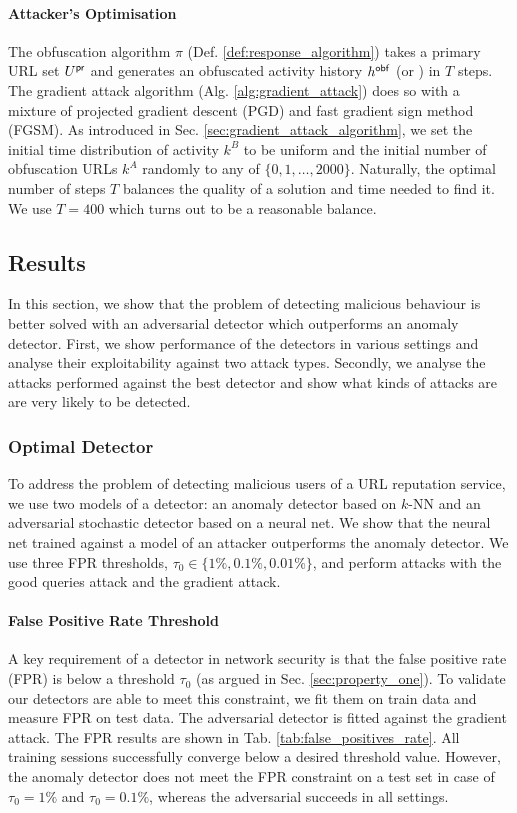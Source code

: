 \paragraph{Attacker's Optimisation}
The obfuscation algorithm $\pi$ (Def. \ref{def:response_algorithm}) takes a primary URL set $U^{\mathsf{pr}}$ and generates an obfuscated activity history $h^{\mathsf{obf}}$ (or \NA) in $T$ steps. The gradient attack algorithm (Alg. \ref{alg:gradient_attack}) does so with a mixture of projected gradient descent (PGD) and fast gradient sign method (FGSM).
As introduced in Sec. \ref{sec:gradient_attack_algorithm}, we set the initial time distribution of activity $k^B$ to be uniform and the initial number of obfuscation URLs $k^A$ randomly to any of $\{0, 1, \dots, 2000 \}$. Naturally, the optimal number of steps $T$ balances the quality of a solution and time needed to find it. We use $T = 400$ which turns out to be a reasonable balance.

\subsection{Results}
In this section, we show that the problem of detecting malicious behaviour is better solved with an adversarial detector which outperforms an anomaly detector. First, we show performance of the detectors in various settings and analyse their exploitability against two attack types. Secondly, we analyse the attacks performed against the best detector and show what kinds of attacks are are very likely to be detected.

\subsubsection{Optimal Detector}\label{sec:optimal_detector}
To address the problem of detecting malicious users of a URL reputation service, we use two models of a detector: an anomaly detector based on $k$-NN and an adversarial stochastic detector based on a neural net. We show that the neural net trained against a model of an attacker outperforms the anomaly detector. We use three FPR thresholds, $\tau_0 \in \{ 1\%, 0.1\%, 0.01\% \}$, and perform attacks with the good queries attack and the gradient attack.

\paragraph{False Positive Rate Threshold}
A key requirement of a detector in network security is that the false positive rate (FPR) is below a threshold $\tau_0$ (as argued in Sec. \ref{sec:property_one}). To validate our detectors are able to meet this constraint, we fit them on train data and measure FPR on test data. The adversarial detector is fitted against the gradient attack. The FPR results are shown in Tab. \ref{tab:false_positives_rate}. All training sessions successfully converge below a desired threshold value. However, the anomaly detector does not meet the FPR constraint on a test set in case of $\tau_0 = 1\%$ and $\tau_0 = 0.1\%$, whereas the adversarial succeeds in all settings.


